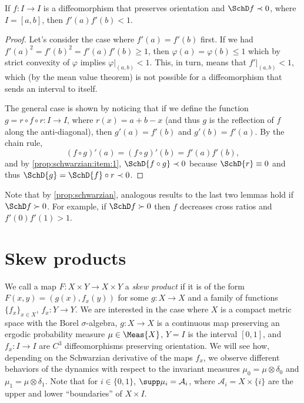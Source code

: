 \documentclass[../main]{subfiles}
\begin{document}
\begin{lemma}\label{lem:bound-deriv-schwarz}
  If \(f \colon I \to I\) is a diffeomorphism that preserves orientation and \(\SchD f \prec 0\), where \(I = [a,b]\), then \(f'(a)f'(b) < 1\).
\end{lemma}

\begin{proof}
  Let's consider the case where \(f'(a) = f'(b)\) first. If we had \(f'(a)^2 = f'(b)^2 = f'(a)f'(b) \ge 1\), then \(\varphi(a) = \varphi(b) \le 1\) which by strict convexity of \(\varphi\) implies \(\varphi|_{(a,b)} < 1\). This, in turn, means that \(f'|_{(a,b)} < 1\), which (by the mean value theorem) is not possible for a diffeomorphism that sends an interval to itself.

  The general case is shown by noticing that if we define the function \(g = r \circ f \circ r \colon I \to I\), where \(r(x) = a + b - x\) (and thus \(g\) is the reflection of \(f\) along the anti-diagonal), then \(g'(a) = f'(b)\) and \(g'(b) = f'(a)\). By the chain rule,
  \begin{equation*}
    (f \circ g)'(a) = (f \circ g)'(b) = f'(a)f'(b),
  \end{equation*}
  and by \cref{prop:schwarzian:item:1}, \(\SchD{f \circ g} \prec 0\) because \(\SchD{r} \equiv 0\) and thus \(\SchD{g} = \SchD{f} \circ r \prec 0\).
\end{proof}

Note that by \cref{prop:schwarzian}, analogous results to the last two lemmas hold if \(\SchD f \succ 0\). For example, if \(\SchD f \succ 0\) then \(f\) decreases cross ratios and \(f'(0)f'(1) > 1\).


\section{Skew products}

We call a map \(F \colon X \times Y \to X \times Y\) a \emph{skew product} if it is of the form \(F(x,y) = (g(x), f_x(y))\) for some \(g \colon X \to X\) and a family of functions \(\{ f_x \}_{x \in X}\), \(f_x \colon Y \to Y\). We are interested in the case where \(X\) is a compact metric space with the Borel \(\sigma\)-algebra, \(g \colon X \to X\) is a continuous map preserving an ergodic probability measure \(\mu \in \Meas{X}\), \(Y = I\) is the interval \([0,1]\), and \(f_x \colon I \to I\) are \(C^3\) diffeomorphisms preserving orientation. We will see how, depending on the Schwarzian derivative of the maps \(f_x\), we observe different behaviors of the dynamics with respect to the invariant measures \(\mu_0 = \mu \otimes \delta_0\) and \(\mu_1 = \mu \otimes \delta_1\). Note that for \(i \in \{ 0,1 \}\), \(\supp \mu_i = \mathcal{A}_i\), where \(\mathcal{A}_i = X \times \{ i \}\) are the upper and lower ``boundaries'' of \(X \times I\).
\end{document}
